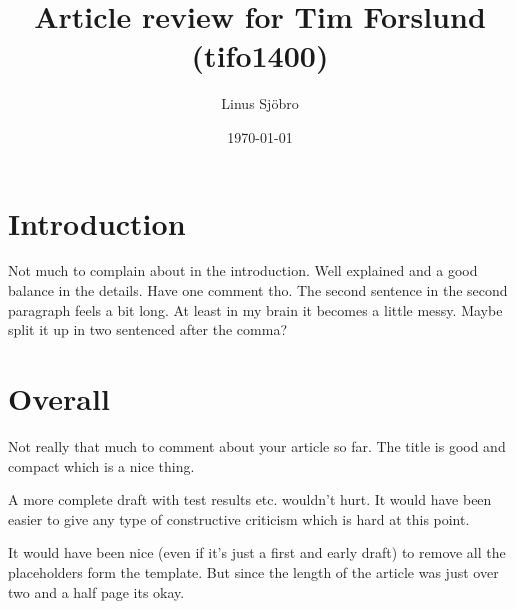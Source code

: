 \documentclass[12pt]{article}
\title{Article review for Tim Forslund (tifo1400)}
\author{Linus Sjöbro}
\date{\today}
\begin{document}
\maketitle


\section{Introduction} \label{}
Not much to complain about in the introduction. Well explained and a good balance in the details. 
Have one comment tho. The second sentence in the second paragraph feels a bit long. At least in my brain it becomes a little messy. Maybe split it up in two sentenced after the comma?

\section{Overall} \label{}
Not really that much to comment about your article so far.
The title is good and compact which is a nice thing.

\bigskip

A more complete draft with test results etc. wouldn't hurt. It would have been easier to give any type of constructive criticism which is hard at this point.

\bigskip

It would have been nice (even if it's just a first and early draft) to remove all the placeholders form the template. But since the length of the article was just over two and a half page its okay.
\end{document}
